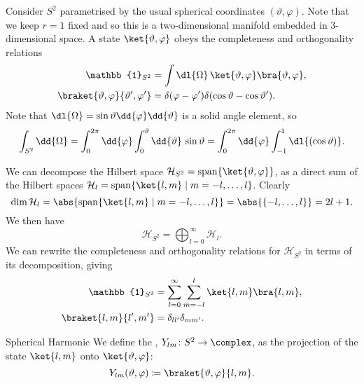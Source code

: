 \documentclass[fleqn]{NotesClass}
\newcommand*{\hilbert}{\mathcal{H}}
\newcommand*{\ident}{\mathbb{1}}
\DeclareMathOperator{\spn}{span}
\begin{document}
    Consider \(S^2\) parametrised by the usual spherical coordinates \((\vartheta, \varphi)\).
    Note that we keep \(r = 1\) fixed and so this is a two-dimensional manifold embedded in 3-dimensional space.
    A state \(\ket{\vartheta, \varphi}\) obeys the completeness and orthogonality relations
    \begin{align}
        \ident_{S^2} &= \int \dl{\Omega} \, \ket{\vartheta, \varphi}\bra{\vartheta, \varphi},\\
        \braket{\vartheta, \varphi}{\vartheta', \varphi'} &= \delta(\varphi - \varphi')\delta(\cos\vartheta - \cos\vartheta').
    \end{align}
    Note that \(\dl{\Omega} = \sin\vartheta \dd{\varphi}\dd{\vartheta}\) is a solid angle element, so
    \begin{equation}
        \int_{S^2}\dd{\Omega} = \int_0^{2\pi} \dd{\varphi} \int_{0}^{\vartheta} \dd{\vartheta} \, \sin\vartheta = \int_0^{2\pi} \dd{\varphi} \int_{-1}^{1} \dl{(\cos \vartheta)}.
    \end{equation}

    We can decompose the Hilbert space \(\hilbert_{S^2} = \spn\{\ket{\vartheta, \varphi}\}\), as a direct sum of the Hilbert spaces \(\hilbert_{l} = \spn\{\ket{l, m} \mid m = -l, \dotsc, l\}\).
    Clearly
    \begin{equation}
        \dim\hilbert_l = \abs{\spn\{\ket{l, m} \mid m = -l, \dotsc, l\}} = \abs{\{-l, \dotsc, l\}} = 2l + 1.
    \end{equation}
    We then have
    \begin{equation}
        \hilbert_{S^2} = \bigoplus_{l = 0}^{\infty} \hilbert_l.
    \end{equation}
    We can rewrite the completeness and orthogonality relations for \(\hilbert_{S^2}\) in terms of its decomposition, giving
    \begin{align}
        \ident_{S^2} &= \sum_{l = 0}^{\infty}\sum_{m = -l}^{l} \ket{l, m}\bra{l, m},\\
        \braket{l, m}{l', m'} &= \delta_{ll'}\delta_{mm'}.
    \end{align}
    
    \begin{dfn}{Spherical Harmonic}{}
        We define the , \(Y_{lm}\colon S^2 \to \complex\), as the projection of the state \(\ket{l, m}\) onto \(\ket{\vartheta, \varphi}\):
        \begin{equation}
            Y_{lm}(\vartheta, \varphi) \coloneqq \braket{\vartheta, \varphi}{l, m}.
        \end{equation}
    \end{dfn}
    
\end{document}
